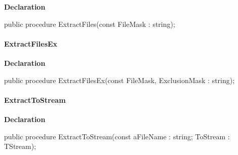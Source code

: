 \documentclass{report}
\newif\ifpdf
\begin{document}
\label{AbUnzper.TAbCustomUnZipper-ExtractFiles}
\begin{list}{}{
\setlength{\itemindent}{0cm}
\setlength{\listparindent}{0cm}
\setlength{\leftmargin}{\evensidemargin}
\addtolength{\leftmargin}{\tmplength}
\settowidth{\labelsep}{X}
\addtolength{\leftmargin}{\labelsep}
\setlength{\labelwidth}{\tmplength}
}
\item[\textbf{Declaration}\hfill]
\ifpdf
\begin{flushleft}
\fi
\begin{ttfamily}
public procedure ExtractFiles(const FileMask : string);\end{ttfamily}

\ifpdf
\end{flushleft}
\fi

\end{list}
\paragraph*{ExtractFilesEx}\hspace*{\fill}

\label{AbUnzper.TAbCustomUnZipper-ExtractFilesEx}
\begin{list}{}{
\setlength{\itemindent}{0cm}
\setlength{\listparindent}{0cm}
\setlength{\leftmargin}{\evensidemargin}
\addtolength{\leftmargin}{\tmplength}
\settowidth{\labelsep}{X}
\addtolength{\leftmargin}{\labelsep}
\setlength{\labelwidth}{\tmplength}
}
\item[\textbf{Declaration}\hfill]
\ifpdf
\begin{flushleft}
\fi
\begin{ttfamily}
public procedure ExtractFilesEx(const FileMask, ExclusionMask : string);\end{ttfamily}

\ifpdf
\end{flushleft}
\fi

\end{list}
\paragraph*{ExtractToStream}\hspace*{\fill}

\label{AbUnzper.TAbCustomUnZipper-ExtractToStream}
\begin{list}{}{
\setlength{\itemindent}{0cm}
\setlength{\listparindent}{0cm}
\setlength{\leftmargin}{\evensidemargin}
\addtolength{\leftmargin}{\tmplength}
\settowidth{\labelsep}{X}
\addtolength{\leftmargin}{\labelsep}
\setlength{\labelwidth}{\tmplength}
}
\item[\textbf{Declaration}\hfill]
\ifpdf
\begin{flushleft}
\fi
\begin{ttfamily}
public procedure ExtractToStream(const aFileName : string; ToStream : TStream);\end{ttfamily}

\ifpdf
\end{flushleft}
\fi

\end{list}
\end{document}

